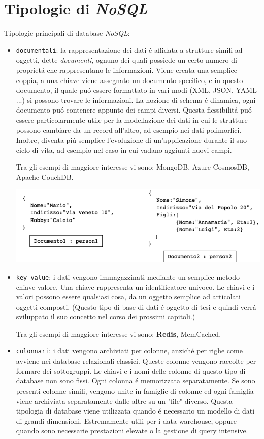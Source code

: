 \section{Tipologie di \emph{NoSQL}}
Tipologie principali di database \emph{NoSQL}:
\begin{itemize}
    \item \texttt{documentali}: la rappresentazione dei dati é affidata a strutture simili ad oggetti, dette \emph{documenti}, ognuno dei
    quali possiede un certo numero di proprietá che rappresentano le informazioni.
    Viene creata una semplice coppia, a una chiave viene assegnato un documento specifico, e in questo documento, il quale puó essere
    formattato in vari modi (XML, JSON, YAML ...) si possono trovare le informazioni.
    La nozione di schema é dinamica, ogni documento puó contenere appunto dei campi diversi. Questa flessibilitá puó essere particolarmente
    utile per la modellazione dei dati in cui le strutture possono cambiare da un record all'altro, ad esempio nei dati polimorfici.
    Inoltre, diventa piú semplice l'evoluzione di un'applicazione durante il suo ciclo di vita, ad esempio nel caso in cui vadano aggiunti nuovi
    campi.

    Tra gli esempi di maggiore interesse vi sono: MongoDB, Azure CosmosDB, Apache CouchDB.

    \includegraphics[width=1\textwidth]{img/dbDocumentale}

    \item \texttt{key-value}: i dati vengono immagazzinati mediante un semplice metodo chiave-valore. Una chiave rappresenta un identificatore
    univoco. Le chiavi e i valori possono essere qualsiasi cosa, da un oggetto semplice ad articolati oggetti composti.
    (Questo tipo di base di dati é oggetto di tesi e quindi verrá sviluppato il suo concetto nel corso dei prossimi capitoli.)

    Tra gli esempi di maggiore interesse vi sono: \textbf{Redis}, MemCached.
    \item \texttt{colonnari}: i dati vengono archiviati per colonne, anziché per righe come avviene nei database relazionali classici.
    Queste colonne vengono raccolte per formare dei sottogruppi. Le chiavi e i nomi delle colonne di questo tipo di database non sono fissi.
    Ogni colonna é memorizzata separatamente. Se sono presenti colonne simili, vengono unite in famiglie di colonne ed ogni famiglia
    viene archiviata separatamente dalle altre su un "file" diverso.
    Questa tipologia di database viene utilizzata quando é necessario un modello di dati di grandi dimensioni. Estremamente utili
    per i data warehouse, oppure quando sono necessarie prestazioni elevate o la gestione di query intensive.


\end{itemize}
